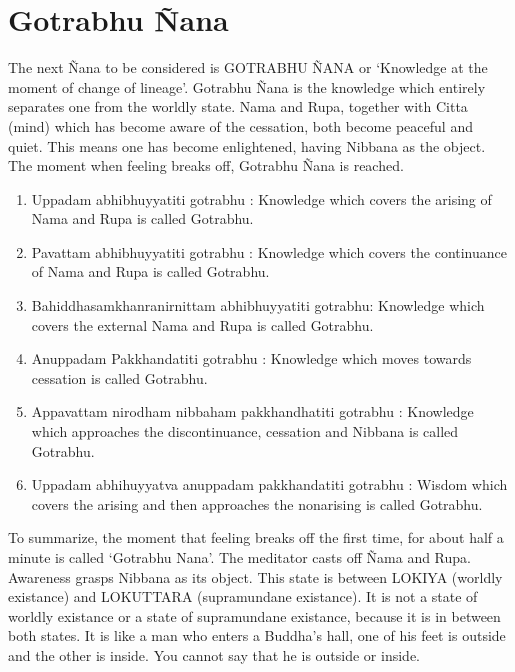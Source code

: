 \documentclass[a5paper,10pt,english]{book}
\begin{document}
\section{Gotrabhu Ñana}
\label{\detokenize{progress:gotrabhu-nana}}
\sphinxAtStartPar
The next Ñana to be considered is GOTRABHU ÑANA or ‘Knowledge at the moment of change of lineage’. Gotrabhu Ñana is the knowledge which entirely separates one from the worldly state. Nama and Rupa, together with Citta (mind) which has become aware of the cessation, both become peaceful and quiet. This means one has become enlightened, having Nibbana as the object. The moment when feeling breaks off, Gotrabhu Ñana is reached.
\begin{enumerate}
%
\item {} 
\sphinxAtStartPar
Uppadam abhibhuyyatiti gotrabhu : Knowledge which covers the arising of Nama and Rupa is called Gotrabhu.

\item {} 
\sphinxAtStartPar
Pavattam abhibhuyyatiti gotrabhu : Knowledge which covers the continuance of Nama and Rupa is called Gotrabhu.

\item {} 
\sphinxAtStartPar
Bahiddhasamkhanranirnittam abhibhuyyatiti gotrabhu: Knowledge which covers the external Nama and Rupa is called Gotrabhu.

\item {} 
\sphinxAtStartPar
Anuppadam Pakkhandatiti gotrabhu : Knowledge which moves towards cessation is called Gotrabhu.

\item {} 
\sphinxAtStartPar
Appavattam nirodham nibbaham pakkhandhatiti gotrabhu : Knowledge which approaches the discontinuance, cessation and Nibbana is called Gotrabhu.

\item {} 
\sphinxAtStartPar
Uppadam abhihuyyatva anuppadam pakkhandatiti gotrabhu : Wisdom which covers the arising and then approaches the non\sphinxhyphen{}arising is called Gotrabhu.

\end{enumerate}

\sphinxAtStartPar
To summarize, the moment that feeling breaks off the first time, for about half a minute is called ‘Gotrabhu Nana’. The meditator casts off Ñama and Rupa. Awareness grasps Nibbana as its object. This state is between LOKIYA (worldly existance) and LOKUTTARA (supramundane existance). It is not a state of worldly existance or a state of supramundane existance, because it is in between both states. It is like a man who enters a Buddha’s hall, one of his feet is outside and the other is inside. You cannot say that he is outside or inside.
\end{document}
